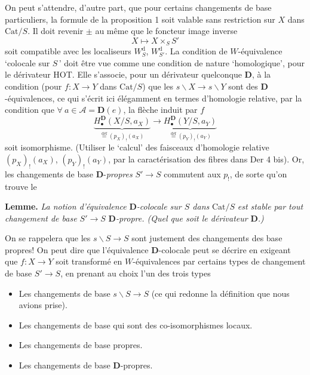 \documentclass[11pt]{article}
\newcommand{\printedpage}[1]{\marginpar{\footnotesize p.~#1}}
\newcommand{\msp}[1]{\marginpar{\footnotesize [#1]}}
\newcommand{\Cat}{\mathrm{Cat}}
\begin{document}
On peut s'attendre, d'autre part, que pour certains changements de base particuliers, la formule de la proposition 1 soit valable sans restriction sur $X$ dans $\Cat/S$. Il doit revenir $\pm$ au même que le foncteur image inverse
\[
X \longmapsto X \times_S S'
\]
soit compatible avec les localiseurs $W_S^{\mathrm{d}}$, $W_{S'}^{\mathrm{d}}$. La condition de $W$-équivalence `colocale sur $S$\,' doit être vue comme une condition de nature `homologique', pour le dérivateur HOT. Elle s'associe, pour un dérivateur quelconque $\mathbf{D}$, à la condition (pour $f : X \longrightarrow Y$ dans $\Cat/S$) que les $s\backslash X \longrightarrow s\backslash Y$ sont des $\mathbf{D}$-équivalences,
\printedpage{75}
\msp{page 121}
ce qui s'écrit ici élégamment en termes d'homologie relative, par la condition que $\forall\ a \in \mathcal{A} = \mathbf{D}(e)$, la flèche induit par $f$ %
\[
\underbrace{H_\bullet^{\mathbf{D}}(X/S, a_X)}_{\overset{\text{déf}}{=}(p_X)_!(a_X)} \longrightarrow \underbrace{H_\bullet^{\mathbf{D}}(Y/S, a_Y)}_{\overset{\text{déf}}{=}(p_Y)_!(a_Y)}
\]
soit isomorphisme. (Utiliser le `calcul' des faisceaux d'homologie relative $(p_X)_!(a_X)$, $(p_Y)_!(a_Y)$, par la caractérisation des fibres dans Der 4 bis). Or, les changements de base $\mathbf{D}$-\textit{propres} $S' \longrightarrow S$ commutent aux $p_!$, de sorte qu'on trouve le

\textbf{Lemme.} \textit{La notion d'équivalence} $\mathbf{D}$\textit{-colocale sur $S$ dans} $\Cat/S$ \textit{est stable par tout changement de base $S' \longrightarrow S$} $\mathbf{D}$\textit{-propre. (Quel que soit le dérivateur} $\mathbf{D}$\textit{.)}

On se rappelera que les $s\backslash S \longrightarrow S$ sont justement des changements des base propres! On %
peut dire que l'équivalence $\mathbf{D}$-colocale peut se décrire en exigeant que $f : X \longrightarrow Y$ soit transformé en $W$-équivalences par certains types de changement de base $S' \longrightarrow S$, en prenant au choix l'un des trois types

\begin{itemize}
\item[a)] Les changements de base $s\backslash S \longrightarrow S$ (ce qui redonne la définition que nous avions prise).
\item[b)] Les changements de base qui sont des co-isomorphismes locaux.
\item[c)] Les changements de base propres.
\item[d)] Les changements de base $\mathbf{D}$-propres.
\end{itemize}
\end{document}
